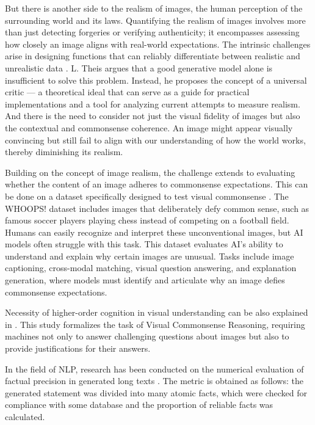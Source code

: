 \documentclass[11pt]{article}
\begin{document}
But there is another side to the realism of images, the human perception of the surrounding world and its laws. Quantifying the realism of images involves more than just detecting forgeries or verifying authenticity; it encompasses assessing how closely an image aligns with real-world expectations. The intrinsic challenges arise in designing functions that can reliably differentiate between realistic and unrealistic data \cite{realistic_image}. L. Theis argues that a good generative model alone is insufficient to solve this problem. Instead, he proposes the concept of a universal critic — a theoretical ideal that can serve as a guide for practical implementations and a tool for analyzing current attempts to measure realism. And there is the need to consider not just the visual fidelity of images but also the contextual and commonsense coherence. An image might appear visually convincing but still fail to align with our understanding of how the world works, thereby diminishing its realism.

Building on the concept of image realism, the challenge extends to evaluating whether the content of an image adheres to commonsense expectations. This can be done on a dataset specifically designed to test visual commonsense \cite{whoops}. The WHOOPS! dataset includes images that deliberately defy common sense, such as famous soccer players playing chess instead of competing on a football field. Humans can easily recognize and interpret these unconventional images, but AI models often struggle with this task. This dataset evaluates AI's ability to understand and explain why certain images are unusual. Tasks include image captioning, cross-modal matching, visual question answering, and explanation generation, where models must identify and articulate why an image defies commonsense expectations.

Necessity of higher-order cognition in visual understanding can be also explained in \cite{visual_commonsense_reasoning}. This study formalizes the task of Visual Commonsense Reasoning, requiring machines not only to answer challenging questions about images but also to provide justifications for their answers.

In the field of NLP, research has been conducted on the numerical evaluation of factual precision in generated long texts \cite{min-etal-2023-factscore}. The metric is obtained as follows: the generated statement was divided into many atomic facts, which were checked for compliance with some database and the proportion of reliable facts was calculated.
\end{document}
